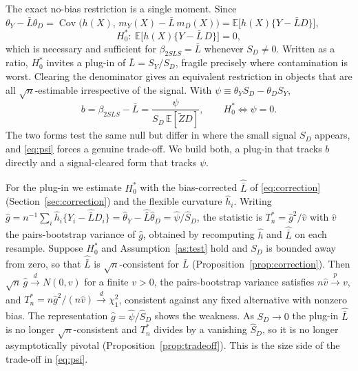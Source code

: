 \documentclass[preprint,11pt,authoryear]{elsarticle}
\theoremstyle{definition}
\newcommand{\E}{\mathbb{E}}
\newcommand{\Cov}{\operatorname{Cov}}
\newcommand{\Ztil}{\tilde{Z}}
\newcommand{\convd}{\overset{d}{\longrightarrow}}
\newcommand{\convp}{\overset{p}{\longrightarrow}}
\begin{document}
The exact no-bias restriction is a single moment. Since
$\theta_Y-\bar L\theta_D=\Cov\!\big(h(X),\,m_Y(X)-\bar L\,m_D(X)\big)
=\E\!\big[h(X)\{Y-\bar L D\}\big]$,
\begin{equation}\label{eq:exactnull}
H_0^{\ast}:\ \E\!\big[h(X)\{Y-\bar L\,D\}\big]=0,
\end{equation}
which is necessary and sufficient for $\beta_{2SLS}=\bar L$ whenever $S_D\neq0$.
Written as a ratio, $H_0^{\ast}$ invites a plug-in of
$\bar L=S_Y/S_D$, fragile precisely where contamination is worst. Clearing the
denominator gives an equivalent restriction in objects that are all
$\sqrt n$-estimable irrespective of the signal. With
$\psi\equiv\theta_Y S_D-\theta_D S_Y$,
\begin{equation}\label{eq:psi}
b=\beta_{2SLS}-\bar L=\frac{\psi}{S_D\,\E[\Ztil D]},
\qquad H_0^{\ast}\iff\psi=0 .
\end{equation}
The two forms test the same null but differ in where the small signal $S_D$ appears,
and \eqref{eq:psi} forces a genuine trade-off. We build both, a plug-in that tracks
$b$ directly and a signal-cleared form that tracks $\psi$.

For the plug-in we estimate $H_0^{\ast}$ with the bias-corrected $\hat{\bar L}$ of
\eqref{eq:correction} (Section~\ref{sec:correction}) and the flexible curvature
$\hat h_i$. Writing
$\hat g=n^{-1}\sum_i \hat h_i\{Y_i-\hat{\bar L}D_i\}
=\hat\theta_Y-\hat{\bar L}\hat\theta_D=\hat\psi/\hat S_D$, the statistic is
$T_n^{\ast}=\hat g^2/\hat v$ with $\hat v$ the pairs-bootstrap variance of $\hat g$,
obtained by recomputing $\hat h$ and $\hat{\bar L}$ on each resample. Suppose
$H_0^{\ast}$ and Assumption~\ref{as:test} hold and $S_D$ is bounded away from zero, so
that $\hat{\bar L}$ is $\sqrt n$-consistent for $\bar L$
(Proposition~\ref{prop:correction}). Then $\sqrt n\,\hat g\convd N(0,v)$ for a finite
$v>0$, the pairs-bootstrap variance satisfies $n\hat v\convp v$, and
$T_n^{\ast}=n\hat g^2/(n\hat v)\convd\chi^2_1$, consistent against any fixed
alternative with nonzero bias. The representation $\hat g=\hat\psi/\hat S_D$ shows the
weakness. As $S_D\to0$ the plug-in $\hat{\bar L}$ is no longer $\sqrt n$-consistent and
$T_n^{\ast}$ divides by a vanishing $\hat S_D$, so it is no longer asymptotically
pivotal (Proposition~\ref{prop:tradeoff}). This is the size side of the trade-off in
\eqref{eq:psi}.
\end{document}
